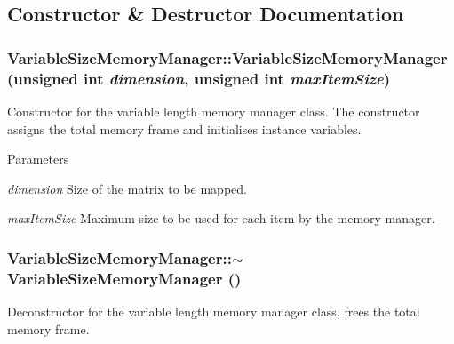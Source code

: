 \subsection{Constructor \& Destructor Documentation}
\hypertarget{classVariableSizeMemoryManager_ae7e72a8180b81def60c5c57078accd3e}{
\subsubsection[{VariableSizeMemoryManager}]{\setlength{\rightskip}{0pt plus 5cm}VariableSizeMemoryManager::VariableSizeMemoryManager (unsigned int {\em dimension}, \/  unsigned int {\em maxItemSize})}}
\label{classVariableSizeMemoryManager_ae7e72a8180b81def60c5c57078accd3e}
Constructor for the variable length memory manager class. The constructor assigns the total memory frame and initialises instance variables.


\begin{DoxyParams}{Parameters}
\item[{\em dimension}]Size of the matrix to be mapped. \item[{\em maxItemSize}]Maximum size to be used for each item by the memory manager. \end{DoxyParams}
\hypertarget{classVariableSizeMemoryManager_a32762e0e33c95bda77a7ff41813d0296}{
\subsubsection[{$\sim$VariableSizeMemoryManager}]{\setlength{\rightskip}{0pt plus 5cm}VariableSizeMemoryManager::$\sim$VariableSizeMemoryManager ()}}
\label{classVariableSizeMemoryManager_a32762e0e33c95bda77a7ff41813d0296}
Deconstructor for the variable length memory manager class, frees the total memory frame. 

